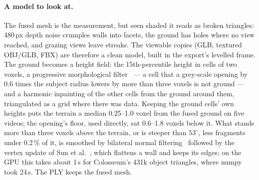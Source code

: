 \documentclass[10pt,a4paper,twocolumn]{article}
\begin{document}
\paragraph{A model to look at.} The fused mesh is the measurement, but seen shaded it reads as broken triangles: 480\,px depth noise crumples walls into facets, the ground has holes where no view reached, and grazing views leave streaks. The viewable copies (GLB, textured OBJ/GLB, FBX) are therefore a clean model, built in the export's levelled frame. The ground becomes a height field: the 15th-percentile height in cells of two voxels, a progressive morphological filter~\cite{zhang2003pmf} --- a cell that a grey-scale opening by 0.6 times the subject radius lowers by more than three voxels is not ground --- and a harmonic inpainting of the other cells from the ground around them, triangulated as a grid where there was data. Keeping the ground cells' own heights puts the terrain a median 0.25--1.0 voxel from the fused ground on five videos; the opening's floor, used directly, sat 0.6--1.8 voxels below it. What stands more than three voxels above the terrain, or is steeper than $53^\circ$, less fragments under 0.2\,\% of it, is smoothed by bilateral normal filtering~\cite{zheng2011bilateral} followed by the vertex update of Sun et al.~\cite{sun2007denoising}, which flattens a wall and keeps its edges; on the GPU this takes about 1\,s for Colosseum's 431k object triangles, where numpy took 24\,s. The PLY keeps the fused mesh.
\end{document}
